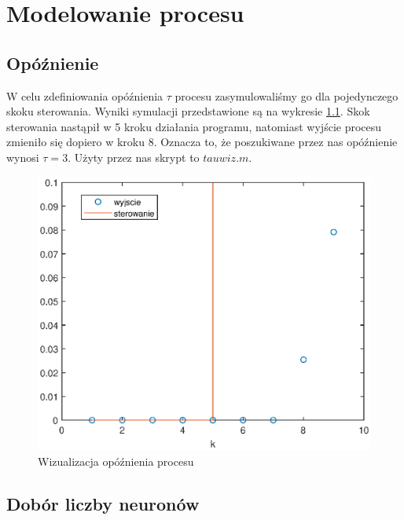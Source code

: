 \chapter{Modelowanie procesu}
	\label{ch:mod}
	
	\section{Opóźnienie}
		\label{sec:tau}
		
		W celu zdefiniowania opóźnienia $\tau$ procesu zasymulowaliśmy go dla pojedynczego skoku sterowania. Wyniki symulacji przedstawione są na wykresie \ref{fig:tau}. Skok sterowania nastąpił w 5 kroku działania programu, natomiast wyjście procesu zmieniło się dopiero w kroku 8. Oznacza to, że poszukiwane przez nas opóźnienie wynosi $\tau = 3$. Użyty przez nas skrypt to $tauwiz.m$.
		
		\begin{figure}[h!]
			\centering
			\includegraphics[width=\linewidth]{img/tau_wizualizacja.eps}
			\caption{Wizualizacja opóźnienia procesu}
			\label{fig:tau}
		\end{figure}
	
	\newpage
	\section{Dobór liczby neuronów}
		\label{sec:neurony}
		
